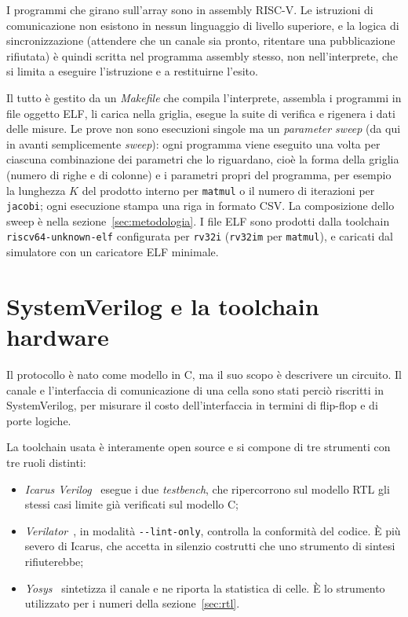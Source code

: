 I programmi che girano sull'array sono in assembly RISC-V. Le istruzioni
di comunicazione non esistono in nessun linguaggio di livello superiore, e
la logica di sincronizzazione (attendere che un canale sia pronto,
ritentare una pubblicazione rifiutata) è quindi scritta nel programma
assembly stesso, non nell'interprete, che si limita a eseguire l'istruzione
e a restituirne l'esito.

Il tutto è gestito da un \emph{Makefile} che compila l'interprete,
assembla i programmi in file oggetto ELF, li carica nella griglia, esegue la
suite di verifica e rigenera i dati delle misure. Le prove non sono esecuzioni
singole ma un \emph{parameter sweep} (da qui in avanti semplicemente \emph{sweep}): 
ogni programma viene eseguito una volta per ciascuna combinazione dei parametri che
lo riguardano, cioè la forma della griglia (numero di righe e di colonne) e i
parametri propri del programma, per esempio la lunghezza $K$ del prodotto interno
per \texttt{matmul} o il numero di iterazioni per \texttt{jacobi}; ogni esecuzione
stampa una riga in formato CSV.
La composizione dello sweep è nella sezione~\ref{sec:metodologia}. I file ELF sono prodotti dalla toolchain \texttt{riscv64-unknown-elf} configurata per \texttt{rv32i}
(\texttt{rv32im} per \texttt{matmul}), e caricati
dal simulatore con un caricatore ELF minimale.
\clearpage
\section{SystemVerilog e la toolchain hardware}
\label{sec:systemverilog}
\enlargethispage{2\baselineskip}

Il protocollo è nato come modello in C, ma il suo scopo è descrivere un
circuito. Il canale e l'interfaccia di comunicazione di una cella sono
stati perciò riscritti in SystemVerilog, per misurare il costo
dell'interfaccia in termini di flip-flop e di porte logiche.

La toolchain usata è interamente open source e si compone di tre strumenti con tre ruoli
distinti:

\begin{itemize}
    \item \emph{Icarus Verilog}~\cite{IcarusVerilog} esegue i due \emph{testbench}, che ripercorrono
          sul modello RTL gli stessi casi limite già verificati sul modello C;
    \item \emph{Verilator}~\cite{Verilator}, in modalità \texttt{-{}-lint-only}, controlla la
          conformità del codice. È più severo di Icarus, che accetta in silenzio
          costrutti che uno strumento di sintesi rifiuterebbe;
    \item \emph{Yosys}~\cite{Yosys} sintetizza il canale e ne riporta la statistica di
          celle. È lo strumento utilizzato per i numeri della sezione~\ref{sec:rtl}.
\end{itemize}

